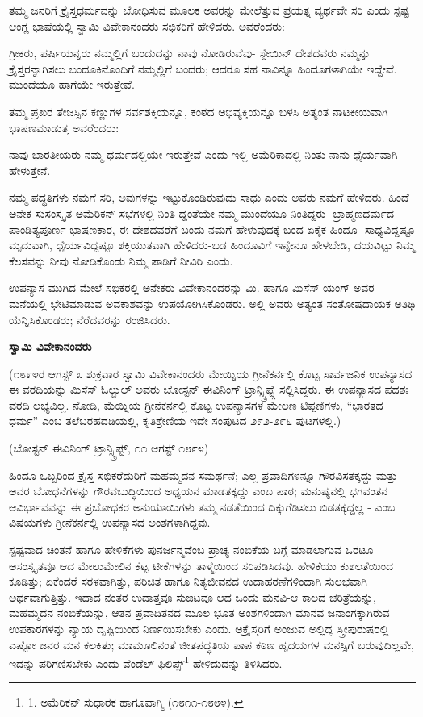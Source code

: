 ತಮ್ಮ ಜನರಿಗೆ ಕ್ರೈಸ್ತಧರ್ಮವನ್ನು ಬೋಧಿಸುವ ಮೂಲಕ ಅವರನ್ನು ಮೇಲೆತ್ತುವ ಪ್ರಯತ್ನ ವ್ಯರ್ಥವೇ ಸರಿ ಎಂದು ಸ್ಪಷ್ಟ ಆಂಗ್ಲ ಭಾಷೆಯಲ್ಲಿ ಸ್ವಾಮಿ ವಿವೇಕಾನಂದರು ಸಭಿಕರಿಗೆ ಹೇಳಿದರು. ಅವರೆಂದರು:

ಗ್ರೀಕರು, ಪರ್ಷಿಯನ್ನರು ನಮ್ಮಲ್ಲಿಗೆ ಬಂದುದನ್ನು ನಾವು ನೋಡಿರುವೆವು- ಸ್ಪೇಯಿನ್ ದೇಶದವರು ನಮ್ಮನ್ನು ಕ್ರೈಸ್ತರನ್ನಾಗಿಸಲು ಬಂದೂಕಿನೊಂದಿಗೆ ನಮ್ಮಲ್ಲಿಗೆ ಬಂದರು; ಆದರೂ ಸಹ ನಾವಿನ್ನೂ ಹಿಂದೂಗಳಾಗಿಯೇ ಇದ್ದೇವೆ. ಮುಂದೆಯೂ ಹಾಗೆಯೇ ಇರುತ್ತೇವೆ.

ತಮ್ಮ ಪ್ರಖರ ತೇಜಸ್ಸಿನ ಕಣ್ಣುಗಳ ಸರ್ವಶಕ್ತಿಯನ್ನೂ, ಕಂಠದ ಅಭಿವ್ಯಕ್ತಿಯನ್ನೂ ಬಳಸಿ ಅತ್ಯಂತ ನಾಟಕೀಯವಾಗಿ ಭಾಷಣಮಾಡುತ್ತ ಅವರೆಂದರು:

ನಾವು ಭಾರತೀಯರು ನಮ್ಮ ಧರ್ಮದಲ್ಲಿಯೇ ಇರುತ್ತೇವೆ ಎಂದು ಇಲ್ಲಿ ಅಮೆರಿಕಾದಲ್ಲಿ ನಿಂತು ನಾನು ಧೈರ್ಯವಾಗಿ ಹೇಳುತ್ತೇನೆ.

ನಮ್ಮ ಪದ್ಧತಿಗಳು ನಮಗೆ ಸರಿ, ಅವುಗಳನ್ನು ಇಟ್ಟುಕೊಂಡಿರುವುದು ಸಾಧು ಎಂದು ಅವರು ನಮಗೆ ಹೇಳಿದರು. ಹಿಂದೆ ಅನೇಕ ಸುಸಂಸ್ಕೃತ ಅಮೆರಿಕನ್ ಸಭೆಗಳಲ್ಲಿ ನಿಂತಿ ದ್ದಂತೆಯೇ ನಮ್ಮ ಮುಂದೆಯೂ ನಿಂತಿದ್ದರು- ಬ್ರಾಹ್ಮಣಧರ್ಮದ ಪಾಂಡಿತ್ಯಪೂರ್ಣ ಭಾಷಣಕಾರ, ಈ ದೇಶದವರೆಗೆ ಬಂದು ನಮಗೆ ಹೇಳುವುದಕ್ಕೆ ಬಂದ ಏಕೈಕ ಹಿಂದೂ -ಸಾಧ್ಯವಿದ್ದಷ್ಟೂ ಮೃದುವಾಗಿ, ಧೈರ್ಯವಿದ್ದಷ್ಟೂ ಶಕ್ತಿಯುತವಾಗಿ ಹೇಳಿದರು-ಬಡ ಹಿಂದೂವಿಗೆ ಇನ್ನೇನೂ ಹೇಳಬೇಡಿ, ದಯವಿಟ್ಟು ನಿಮ್ಮ ಕೆಲಸವನ್ನು ನೀವು ನೋಡಿಕೊಂಡು ನಿಮ್ಮ ಪಾಡಿಗೆ ನೀವಿರಿ ಎಂದು.

ಉಪನ್ಯಾಸ ಮುಗಿದ ಮೇಲೆ ಸಭಿಕರಲ್ಲಿ ಅನೇಕರು ವಿವೇಕಾನಂದರನ್ನು ಮಿ. ಹಾಗೂ ಮಿಸೆಸ್ ಯಂಗ್ ಅವರ ಮನೆಯಲ್ಲಿ ಭೇಟಿಮಾಡುವ ಅವಕಾಶವನ್ನು ಉಪಯೋಗಿಸಿಕೊಂಡರು. ಅಲ್ಲಿ ಅವರು ಅತ್ಯಂತ ಸಂತೋಷದಾಯಕ ಅತಿಥಿ ಯೆನ್ನಿಸಿಕೊಂಡರು; ನೆರೆದವರನ್ನು ರಂಜಿಸಿದರು.

\begin{center}
\textbf{ಸ್ವಾಮಿ ವಿವೇಕಾನಂದರು}
\end{center}

(೧೮೯೪ರ ಆಗಸ್ಟ್ ೩ ಶುಕ್ರವಾರ ಸ್ವಾಮಿ ವಿವೇಕಾನಂದರು ಮೇಯ್ನಿಯ ಗ್ರೀನೆಕರ್ನಲ್ಲಿ ಕೊಟ್ಟ ಸಾರ್ವಜನಿಕ ಉಪನ್ಯಾಸದ ಈ ವರದಿಯನ್ನು ಮಿಸೆಸ್ ಓಲ್ಬುಲ್ ಅವರು ಬೋಸ್ಟನ್ ಈವಿನಿಂಗ್ ಟ್ರಾನ್ಸ್ಕ್ರಿಪ್ಟ್ಗೆ ಸಲ್ಲಿಸಿದ್ದರು. ಈ ಉಪನ್ಯಾಸದ ಪದಶಃ ವರದಿ ಲಭ್ಯವಿಲ್ಲ. ನೋಡಿ, ಮೆಯ್ನಿಯ ಗ್ರೀನೆಕರ್ನಲ್ಲಿ ಕೊಟ್ಟ ಉಪನ್ಯಾಸಗಳ ಮೇಲಣ ಟಿಪ್ಪಣಿಗಳು, “ಭಾರತದ ಧರ್ಮ” ಎಂಬ ತಲೆಬರಹದಡಿಯಲ್ಲಿ, ಕೃತಿಶ್ರೇಣಿಯ ಇದೇ ಸಂಪುಟದ ೨೯೨-೨೯೬ ಪುಟಗಳಲ್ಲಿ.)

\begin{center}
(ಬೋಸ್ಟನ್ ಈವಿನಿಂಗ್ ಟ್ರಾನ್ಸ್ಕ್ರಿಪ್ಟ್, ೧೧ ಆಗಸ್ಟ್ ೧೮೯೪)
\end{center}

ಹಿಂದೂ ಒಬ್ಬರಿಂದ ಕ್ರೈಸ್ತ ಸಭಿಕರೆದುರಿಗೆ ಮಹಮ್ಮದನ ಸಮರ್ಥನೆ; ಎಲ್ಲ ಪ್ರವಾದಿಗಳನ್ನೂ ಗೌರವಿಸತಕ್ಕದ್ದು ಮತ್ತು ಅವರ ಬೋಧನೆಗಳನ್ನು ಗೌರವಬುದ್ಧಿಯಿಂದ ಅಧ್ಯಯನ ಮಾಡತಕ್ಕದ್ದು ಎಂಬ ಪಾಠ; ಮನುಷ್ಯನಲ್ಲಿ ಭಗವಂತನ ಆವಿರ್ಭಾವವನ್ನು ಈ ಪ್ರಬೋಧಕರ ಅನುಯಾಯಿಗಳು ತಮ್ಮ ನಡತೆಯಿಂದ ದಿಕ್ಕುಗೆಡಿಸಲು ಬಿಡತಕ್ಕದ್ದಲ್ಲ - ಎಂಬ ವಿಷಯಗಳು ಗ್ರೀನೆಕರ್ನಲ್ಲಿ ಉಪನ್ಯಾಸದ ಅಂಶಗಳಾಗಿದ್ದವು.

ಸ್ಪಷ್ಟವಾದ ಚಿಂತನೆ ಹಾಗೂ ಹೇಳಿಕೆಗಳು ಪುನರ್ಜನ್ಮವೆಂಬ ಪ್ರಾಚ್ಯ ನಂಬಿಕೆಯ ಬಗ್ಗೆ ಮಾಡಲಾಗುವ ಒರಟೂ ಅಸಂಸ್ಕೃತವೂ ಆದ ಮೇಲುಮೇಲಿನ ಕೆಟ್ಟ ಟೀಕೆಗಳನ್ನು ತಾಳ್ಮೆಯಿಂದ ಸರಿಪಡಿಸಿದವು. ಹೇಳಿಕೆಯು ಕುಶಲತೆಯಿಂದ ಕೂಡಿತ್ತು; ಏಕೆಂದರೆ ಸರಳವಾಗಿತ್ತು, ಪರಿಚಿತ ಹಾಗೂ ನಿತ್ಯಜೀವನದ ಉದಾಹರಣೆಗಳಿಂದಾಗಿ ಸುಲಭವಾಗಿ ಅರ್ಥವಾಗುತ್ತಿತ್ತು. ಇದಾದ ನಂತರ ಉದಾತ್ತವೂ ಸುಙಟವೂ ಆದ ಒಂದು ಮನವಿ-ಆ ಕಾಲದ ಚರಿತ್ರೆಯನ್ನು, ಮಹಮ್ಮದನ ನಂಬಿಕೆಯನ್ನು, ಆತನ ಪ್ರವಾದಿತನದ ಮೂಲ ಭೂತ ಅಂಶಗಳಿಂದಾಗಿ ಮಾನವ ಜನಾಂಗಕ್ಕಾಗಿರುವ ಉಪಕಾರಗಳನ್ನು ನ್ಯಾಯ ದೃಷ್ಟಿಯಿಂದ ನಿರ್ಣಯಿಸಬೇಕು ಎಂದು. ಅಕ್ರೈಸ್ತರಿಗೆ ಅಂಜುವ ಅಲ್ಲಿದ್ದ ಸ್ತ್ರೀಪುರುಷರಲ್ಲಿ ಎಷ್ಟೋ ಜನರ ಮನ ಕಲಕಿತು; ಮಾಮೂಲಿನಂತೆ ಜೀತಪದ್ಧತಿಯ ಪಾಪ ಕಠಿಣ ಹೃದಯಗಳ ಮನಸ್ಸಿಗೆ ಬರುವುದಿಲ್ಲವೇ, ಇದನ್ನು ಪರಿಗಣಿಸಬೇಕು ಎಂದು ವೆಂಡೆಲ್ ಫಿಲಿಪ್ಸ್\footnote{1. ಅಮೆರಿಕನ್ ಸುಧಾರಕ ಹಾಗೂವಾಗ್ಮಿ (೧೮೧೧-೧೮೮೪).} ಹೇಳಿದುದನ್ನು ತಿಳಿಸಿದರು.

